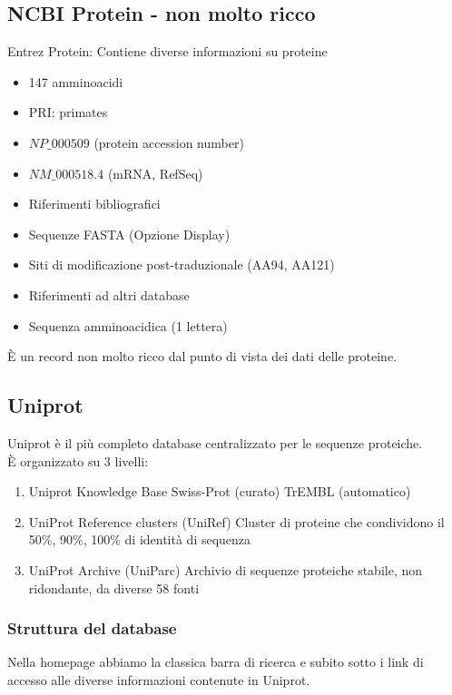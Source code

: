 \documentclass{article}
\begin{document}
\subsection{NCBI Protein - non molto ricco}
Entrez Protein: Contiene diverse informazioni su proteine
\begin{itemize}
    \item 147 amminoacidi
    \item PRI: primates
    \item $NP\_000509$ (protein accession number)
    \item $NM\_000518.4$ (mRNA, RefSeq)
    \item Riferimenti bibliografici
    \item Sequenze FASTA (Opzione Display)
    \item Siti di modificazione post-traduzionale (AA94, AA121)
    \item Riferimenti ad altri database
    \item Sequenza amminoacidica (1 lettera)
\end{itemize}
È un record non molto ricco dal punto di vista dei dati delle proteine.
\subsection{Uniprot}
Uniprot è il più completo database centralizzato per le sequenze proteiche.\\
È organizzato su 3 livelli:
\begin{enumerate}
    \item Uniprot Knowledge Base
        \subitem{-} Swiss-Prot (curato)
        \subitem{-} TrEMBL (automatico)
    \item UniProt Reference
    clusters (UniRef)
        \subitem{-} Cluster di proteine che
        condividono il 50\%, 90\%,
        100\% di identità di
        sequenza
    \item UniProt Archive (UniParc)
        \subitem{-} Archivio di sequenze
        proteiche stabile, non
        ridondante, da diverse 58 fonti
\end{enumerate}
\subsubsection{Struttura del database}
Nella homepage abbiamo la classica barra di ricerca e subito sotto i link di accesso alle diverse informazioni contenute in Uniprot.\\
\end{document}
